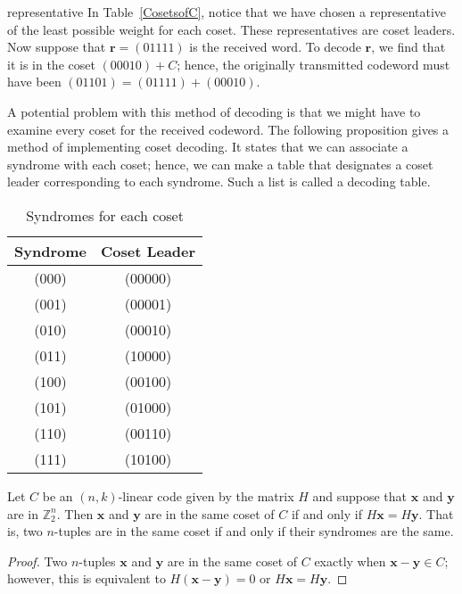 \begin{example}{representative}
In Table~\ref{CosetsofC}, notice that we have chosen a representative of the least
possible weight for each coset.  These representatives are coset
leaders. Now suppose that ${\mathbf r} = (01111)$ is the received word.
To decode ${\mathbf r}$, we find that it is in the coset $(00010) + C$;
hence, the originally transmitted codeword must have been $(01101) =
(01111) + (00010)$. 
\end{example}
 
 
A potential problem with this method of decoding is that we might have
to examine every coset for the received codeword. The following
proposition gives a method of implementing coset decoding. It states
that we can associate a syndrome with each coset; hence, we can make a
table that designates a coset leader corresponding to each syndrome. Such
a list is called a {\bfi decoding table}.
 
 
 \begin{table}[htb]
{\small
\begin{center}
\begin{tabular}{|c|c|}
\hline
Syndrome & Coset Leader \\
\hline
(000) & (00000) \\
(001) & (00001) \\
(010) & (00010) \\
(011) & (10000) \\
(100) & (00100) \\
(101) & (01000) \\
(110) & (00110) \\
(111) & (10100) \\
\hline
\end{tabular}
\end{center}
}
\caption{Syndromes for each coset}\label{SyndromeTable}
\end{table}
 
\begin{proposition}
Let $C$ be an $(n,k)$-linear code given by the matrix $H$ and suppose
that ${\mathbf x}$ and ${\mathbf y}$ are in ${\mathbb Z}_2^n$. Then ${\mathbf
x}$ and ${\mathbf y}$ are in the same coset of $C$ if and only if
$H{\mathbf x} = H{\mathbf y}$. That is, two $n$-tuples are in the same
coset if and only if their syndromes are the same.
\end{proposition}
 
 
\begin{proof}
Two $n$-tuples ${\mathbf x}$ and ${\mathbf y}$ are in the same coset of
$C$ exactly when ${\mathbf x} - {\mathbf y} \in C$; however, this is
equivalent to $H({\mathbf x} - {\mathbf y}) = 0$ or $H {\mathbf x} = H
{\mathbf y}$. 
\end{proof}
 
